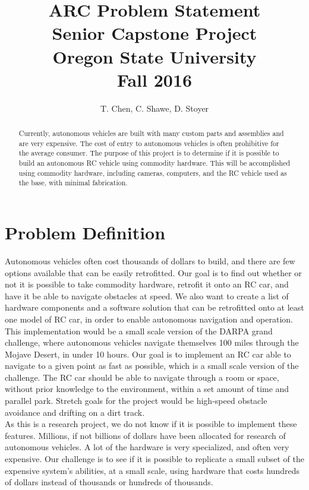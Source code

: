 \documentclass[draftclsnofoot,onecolumn,10pt]{IEEEtran}
\begin{document}
\begin{titlepage}
\title{
ARC Problem Statement\\
\LARGE
Senior Capstone Project\\
Oregon State University\\
Fall 2016
}

\author{T. Chen, C. Shawe, D. Stoyer}
\maketitle

\begin{abstract}
Currently, autonomous vehicles are built with many custom parts and assemblies
and are very expensive. The cost of entry to autonomous vehicles is often
prohibitive for the average consumer. The purpose of this project is to determine
if it is possible to build an autonomous RC vehicle using commodity hardware.
This will be accomplished using commodity hardware, including cameras, computers,
and the RC vehicle used as the base, with minimal fabrication.
\end{abstract}

\thispagestyle{empty} %

\end{titlepage}


\newpage

\section{Problem Definition}
Autonomous vehicles often cost thousands of dollars to build, and there are few
options available that can be easily retrofitted. Our goal is to find out whether
or not it is possible to take commodity hardware, retrofit it onto an RC car, and
have it be able to navigate obstacles at speed. We also want to create a list of
hardware components and a software solution that can be retrofitted onto at least
one model of RC car, in order to enable autonomous navigation and operation.\\
This implementation would be a small scale version of the DARPA grand challenge,
where autonomous vehicles navigate themselves 100 miles through the Mojave Desert,
in under 10 hours. Our goal is to implement an RC car able to navigate to a given
point as fast as possible, which is a small scale version of the challenge. The RC
car should be able to navigate through a room or space, without prior knowledge to
the environment, within a set amount of time and parallel park. Stretch goals for
the project would be high-speed obstacle avoidance and drifting on a dirt track.\\
As this is a research project, we do not know if it is possible to implement 
these features. Millions, if not billions of dollars have been allocated for
research of autonomous vehicles. A lot of the hardware is very specialized, and
often very expensive. Our challenge is to see if it is possible to replicate a small
subset of the expensive system's abilities, at a small scale, using hardware that costs hundreds of dollars instead of thousands or hundreds of thousands. 
\end{document}
